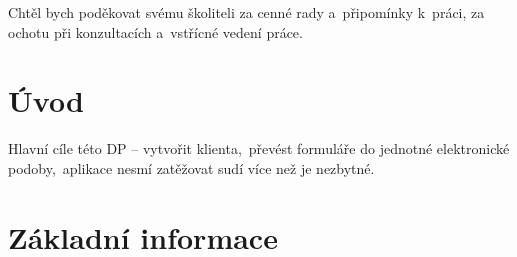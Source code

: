 \documentclass[11pt, oneside]{fithesis2}
\begin{document}
\hyphenation{} %
\FrontMatter
\ThesisTitlePage

% 
% 

\begin{ThesisDeclaration}
\DeclarationText
\AdvisorName
\end{ThesisDeclaration}

\begin{ThesisThanks}
Chtěl bych poděkovat svému školiteli \iffalse doplnte \fi za
cenné rady a~připomínky k~práci, za ochotu při konzultacích a~vstřícné
vedení práce.
\end{ThesisThanks}

\begin{ThesisAbstract}

\end{ThesisAbstract}

\begin{ThesisKeyWords}

\end{ThesisKeyWords}



\MainMatter
\tableofcontents
\chapter{Úvod}

Hlavní cíle této DP -- vytvořit klienta,~převést formuláře do jednotné elektronické podoby,~aplikace nesmí zatěžovat sudí více než je nezbytné.

\chapter{Základní informace}
\end{document}
